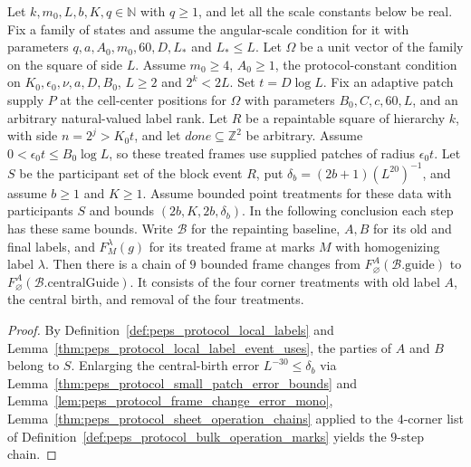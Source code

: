 \begin{lemma}
    \label{thm:peps_protocol_central_birth_chain}
    \leanok
    Let $k,m_0,L,b,K,q\in\mathbb N$ with $q\ge1$, and let all the scale
    constants below be real. Fix a family of states and assume the angular-scale
    condition for it with parameters $q,a,A_0,m_0,60,D,L_*$ and $L_*\le L$. Let
    $\Omega$ be a unit vector of the family on the square of side $L$. Assume $m_0\ge4$,
    $A_0\ge1$, the protocol-constant condition on $K_0,\epsilon_0,\nu,a,D,B_0$,
    $L\ge2$ and $2^k<2L$. Set $t=D\log L$. Fix an adaptive patch supply
    $P$ at the cell-center positions for $\Omega$ with parameters
    $B_0,C,c,60,L$, and an arbitrary natural-valued label rank.
    Let $R$ be a repaintable square of hierarchy $k$, with side $n=2^j>K_0t$,
    and let $\mathit{done}\subseteq\mathbb Z^2$ be arbitrary. Assume
    $0<\epsilon_0t\le B_0\log L$, so these treated frames use supplied
    patches of radius $\epsilon_0t$.
    Let $S$ be the participant set of the block event $R$, put
    $\delta_b=(2b+1)(L^{20})^{-1}$, and assume $b\ge1$ and $K\ge1$.
    Assume bounded point treatments for these data with participants $S$ and
    bounds $(2b,K,2b,\delta_b)$. In the following conclusion each step has
    these same bounds. Write $\mathcal B$ for the repainting baseline,
    $A,B$ for its old and final labels, and $F_M^\lambda(g)$ for its treated
    frame at marks $M$ with homogenizing label $\lambda$.
    Then there is a chain of $9$ bounded frame changes from
    $F_\varnothing^A(\mathcal B.\mathrm{guide})$ to
    $F_\varnothing^A(\mathcal B.\mathrm{centralGuide})$. It consists of the
    four corner treatments with old label $A$, the central birth, and removal
    of the four treatments.
\end{lemma}

\begin{proof}\leanok
    By Definition~\ref{def:peps_protocol_local_labels} and Lemma~\ref{thm:peps_protocol_local_label_event_uses}, the parties of $A$ and $B$ belong to $S$. Enlarging the central-birth error $L^{-30}\le\delta_b$ via Lemma~\ref{thm:peps_protocol_small_patch_error_bounds} and Lemma~\ref{lem:peps_protocol_frame_change_error_mono}, Lemma~\ref{thm:peps_protocol_sheet_operation_chains} applied to the $4$-corner list of Definition~\ref{def:peps_protocol_bulk_operation_marks} yields the $9$-step chain.
\end{proof}

